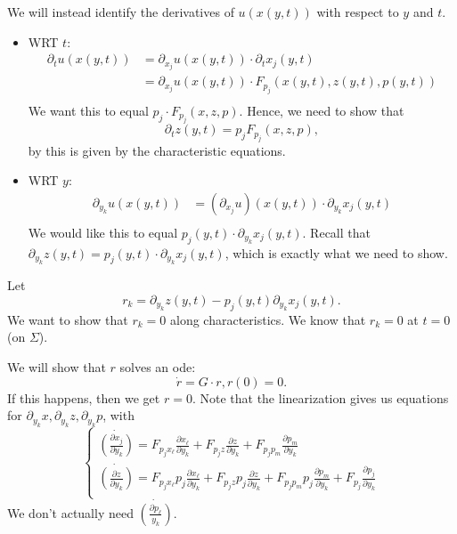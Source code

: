 \documentclass[11pt]{scrartcl}
\begin{document}
We will instead identify the derivatives of $u(x(y, t))$ with respect to $y$ and $t$.
\begin{itemize}
\item WRT $t$:\begin{align*}
\partial_t u(x(y, t)) &= \partial_{x_j}u(x(y, t)) \cdot \partial_t x_j(y, t) \\
&= \partial_{x_j}u(x(y, t))\cdot F_{p_j}(x(y, t), z(y, t), p(y, t)) \\
\end{align*}
We want this to equal $p_j \cdot F_{p_j}(x, z, p)$.  Hence, we need to show that 
$$\partial_t z(y, t) = p_jF_{p_j}(x, z, p),$$
by this is given by the characteristic equations.
\item WRT $y$:
\begin{align*}
\partial_{y_k} u(x(y, t)) &= (\partial_{x_j} u)(x(y, t)) \cdot \partial_{y_k}x_j(y, t)\\
\end{align*}
We would like this to equal $p_j(y, t) \cdot \partial_{y_k}x_j(y, t)$.  Recall that 
$\partial_{y_k}z(y, t) = p_j(y, t) \cdot \partial_{y_k}x_j(y, t)$, which is exactly what we need to show.
\end{itemize} 
Let $$r_k = \partial_{y_k}z(y, t) - p_j( y, t) \partial_{y_k} x_j(y, t).$$  We want to show that $r_k = 0$ along characteristics.  We know that $r_k = 0$ at $t=0$(on $\Sigma$).  

We will show that $r$ solves an ode:
$$\dot r = G \cdot r, r(0) = 0.$$
If this happens, then we get $r=0$.  Note that the linearization gives us equations for $\partial_{y_k} x, \partial_{y_k} z, \partial_{y_k} p$, with 
$$\begin{cases}
\dot{\left (\frac{\partial x_j}{\partial y_k}\right )} = F_{p_j x_\ell}\frac{\partial x_\ell}{\partial y_k} + F_{p_j z} \frac{\partial z}{\partial y_k} + F_{p_jp_m} \frac{\partial p_m}{\partial y_k} \\
\dot{\left (\frac{\partial z}{\partial y_k}\right )} = F_{p_j x_\ell}p_j\frac{\partial x_\ell}{\partial y_k} + F_{p_j z}p_j \frac{\partial z}{\partial y_k} + F_{p_jp_m}p_j \frac{\partial p_m}{\partial y_k}  + F_{p_j}\frac{\partial p_j}{\partial y_k}\\
\end{cases}$$
We don't actually need $\dot{\left (\frac{\partial p_\ell}{y_k}\right )}$.
\end{document}
